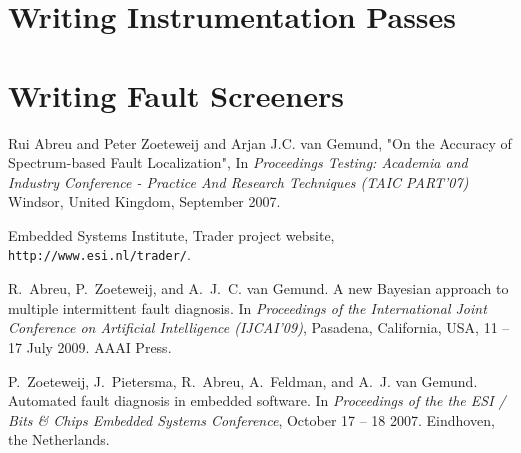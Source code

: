 \documentclass[letterpaper]{report}
\begin{document}
\appendix


% 

\chapter{Writing Instrumentation Passes}
\label{c:WritingInstrumentationPasses}



\chapter{Writing Fault Screeners}
\label{c:WritingFaultScreeners}



%
%
%

\begin{thebibliography}{99}

Rui Abreu and Peter Zoeteweij and Arjan J.C. van Gemund, 
"On the Accuracy of Spectrum-based Fault Localization",
In \emph{Proceedings Testing: Academia and Industry Conference - Practice And Research Techniques (TAIC PART'07)}
Windsor, United Kingdom, September 2007.

Embedded Systems Institute, 
Trader project website,
\verb|http://www.esi.nl/trader/|.

R.~Abreu, P.~Zoeteweij, and A.~J.~C. van Gemund.
\newblock A new {B}ayesian approach to multiple intermittent fault diagnosis.
\newblock In {\em Proceedings of the International Joint Conference on
  Artificial Intelligence (IJCAI'09)}, Pasadena, California, USA, 11 -- 17 July
  2009. AAAI Press.
  
P.~Zoeteweij, J.~Pietersma, R.~Abreu, A.~Feldman, and A.~J. van Gemund.
\newblock Automated fault diagnosis in embedded software.
\newblock In {\em Proceedings of the the ESI / Bits \& Chips Embedded Systems
  Conference}, October 17 -- 18 2007.
\newblock Eindhoven, the Netherlands.
  
\end{thebibliography}
\end{document}
